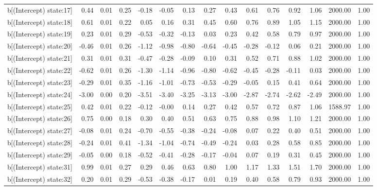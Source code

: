 \begin{table}[ht]
\begin{tabular}{rrrrrrrrrrrrrrr}
  b[(Intercept) state:17] & 0.44 & 0.01 & 0.25 & -0.18 & -0.05 & 0.13 & 0.27 & 0.43 & 0.61 & 0.76 & 0.92 & 1.06 & 2000.00 & 1.00 \\ 
  b[(Intercept) state:18] & 0.61 & 0.01 & 0.22 & 0.05 & 0.16 & 0.31 & 0.45 & 0.60 & 0.76 & 0.89 & 1.05 & 1.15 & 2000.00 & 1.00 \\ 
  b[(Intercept) state:19] & 0.23 & 0.01 & 0.29 & -0.53 & -0.32 & -0.13 & 0.03 & 0.23 & 0.42 & 0.58 & 0.79 & 0.97 & 2000.00 & 1.00 \\ 
  b[(Intercept) state:20] & -0.46 & 0.01 & 0.26 & -1.12 & -0.98 & -0.80 & -0.64 & -0.45 & -0.28 & -0.12 & 0.06 & 0.21 & 2000.00 & 1.00 \\ 
  b[(Intercept) state:21] & 0.31 & 0.01 & 0.31 & -0.47 & -0.28 & -0.09 & 0.10 & 0.31 & 0.52 & 0.71 & 0.88 & 1.02 & 2000.00 & 1.00 \\ 
  b[(Intercept) state:22] & -0.62 & 0.01 & 0.26 & -1.30 & -1.14 & -0.96 & -0.80 & -0.62 & -0.45 & -0.28 & -0.11 & 0.03 & 2000.00 & 1.00 \\ 
  b[(Intercept) state:23] & -0.29 & 0.01 & 0.35 & -1.16 & -1.01 & -0.73 & -0.53 & -0.29 & -0.05 & 0.15 & 0.41 & 0.64 & 2000.00 & 1.00 \\ 
  b[(Intercept) state:24] & -3.00 & 0.00 & 0.20 & -3.51 & -3.40 & -3.25 & -3.13 & -3.00 & -2.87 & -2.74 & -2.62 & -2.49 & 2000.00 & 1.00 \\ 
  b[(Intercept) state:25] & 0.42 & 0.01 & 0.22 & -0.12 & -0.00 & 0.14 & 0.27 & 0.42 & 0.57 & 0.72 & 0.87 & 1.06 & 1588.97 & 1.00 \\ 
  b[(Intercept) state:26] & 0.75 & 0.00 & 0.18 & 0.30 & 0.40 & 0.51 & 0.63 & 0.75 & 0.88 & 0.98 & 1.10 & 1.21 & 2000.00 & 1.00 \\ 
  b[(Intercept) state:27] & -0.08 & 0.01 & 0.24 & -0.70 & -0.55 & -0.38 & -0.24 & -0.08 & 0.07 & 0.22 & 0.40 & 0.51 & 2000.00 & 1.00 \\ 
  b[(Intercept) state:28] & -0.24 & 0.01 & 0.41 & -1.34 & -1.04 & -0.74 & -0.49 & -0.24 & 0.03 & 0.28 & 0.58 & 0.85 & 2000.00 & 1.00 \\ 
  b[(Intercept) state:29] & -0.05 & 0.00 & 0.18 & -0.52 & -0.41 & -0.28 & -0.17 & -0.04 & 0.07 & 0.19 & 0.31 & 0.45 & 2000.00 & 1.00 \\ 
  b[(Intercept) state:31] & 0.99 & 0.01 & 0.27 & 0.29 & 0.46 & 0.63 & 0.80 & 1.00 & 1.17 & 1.33 & 1.51 & 1.70 & 2000.00 & 1.00 \\ 
  b[(Intercept) state:32] & 0.20 & 0.01 & 0.29 & -0.53 & -0.38 & -0.17 & 0.01 & 0.19 & 0.40 & 0.58 & 0.79 & 0.93 & 2000.00 & 1.00 \\ 

\end{tabular}
\end{table}
